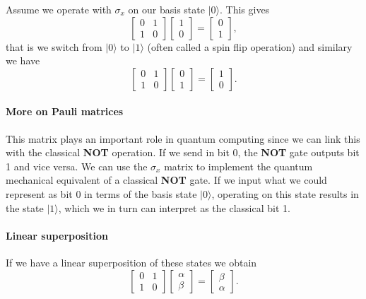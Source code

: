 Assume we operate with $\sigma_x$ on our basis state $\vert 0 \rangle$. This gives
\[
\begin{bmatrix} 0 & 1 \\ 1 & 0 \end{bmatrix}\begin{bmatrix} 1 \\ 0 \end{bmatrix}=\begin{bmatrix} 0  \\ 1  \end{bmatrix},
\]
that is we switch from $\vert 0\rangle$ to $\vert 1\rangle$ (often called a spin flip operation) and similary we have
\[
\begin{bmatrix} 0 & 1 \\ 1 & 0 \end{bmatrix}\begin{bmatrix} 0 \\ 1 \end{bmatrix}=\begin{bmatrix} 1  \\ 0  \end{bmatrix}.
\]


\paragraph{More on Pauli matrices}

This matrix plays an important role in quantum computing since we can
link this with the classical \textbf{NOT} operation.  If we send in bit 0,
the \textbf{NOT} gate outputs bit 1 and vice versa. We can use the $\sigma_x$
matrix to implement the quantum mechanical equivalent of a classical
\textbf{NOT} gate. If we input what we could represent as bit 0 in terms of
the basis state $\vert 0\rangle$, operating on this state results in
the state $\vert 1\rangle$, which we in turn can interpret as the
classical bit 1.


\paragraph{Linear superposition}
If we have a linear superposition of these states we obtain
\[
\begin{bmatrix}0 & 1 \\ 1 & 0 \end{bmatrix}\begin{bmatrix}\alpha \\ \beta \end{bmatrix}=\begin{bmatrix}\beta \\ \alpha \end{bmatrix}.
\]

